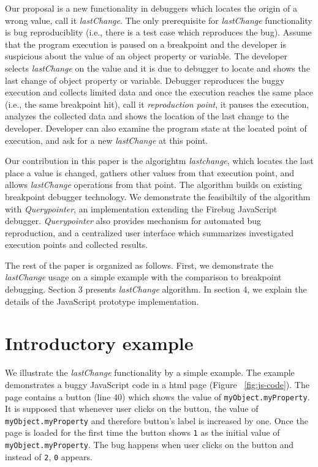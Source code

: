 \documentclass[preprint]{sigplanconf}
\begin{document}
Our proposal is a new functionality in debuggers which locates the origin of a wrong value, call it \textit{lastChange}. The only prerequisite for \textit{lastChange} functionality is bug reproduciblity (i.e., there is a test case which reproduces the bug). Assume that the program execution is paused on a breakpoint and the developer is suspicious about the value of an object property or variable. The developer selects \textit{lastChange} on the value and it is due to debugger to locate and shows the last change of object property or variable. Debugger reproduces the buggy execution and collects limited data and once the execution reaches the same place (i.e., the same breakpoint hit), call it \textit{reproduction point}, it pauses the execution, analyzes the collected data and shows the location of the last change to the developer. Developer can also examine the program state at the located point of execution, and ask for a new \textit{lastChange} at this point.

Our contribution in this paper is the algorightm \textit{lastchange}, which locates the last place a value is changed, gathers other values from that execution point, and allows \textit{lastChange} operations from that point. The algorithm builds on existing breakpoint debugger technology. We demonstrate the feasibiltily of the algorithm with \textit{Querypointer}, an implementation extending the Firebug JavaScript debugger. \textit{Querypointer} also provides mechanism for automated bug reproduction, and a centralized user interface which summarizes investigated execution points and collected results. 

The rest of the paper is organized as follows. First, we demonstrate the \textit{lastChange} usage on a simple example with the comparison to breakpoint debugging. Section 3 presents \textit{lastChange} algorithm. In section 4, we explain the details of the JavaScript prototype implementation. 

\section{Introductory example}

We illustrate the \textit{lastChange} functionality by a simple
example. The example demonstrates a buggy JavaScript code in a html
page (Figure ~\ref{fig:js-code}). The page contains a button (line 40)
which shows the value of \texttt{myObject.myProperty}. It is supposed
that whenever user clicks on the button, the value of
\texttt{myObject.myProperty} and therefore button's label is increased
by one. Once the page is loaded for the first time the button shows
\texttt{1} as the initial value of \texttt{myObject.myProperty}. The
bug happens when user clicks on the button and instead of \texttt{2},
\texttt{0} appears.
\end{document}
